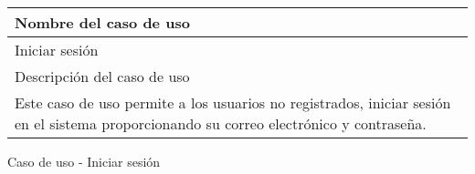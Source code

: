 \begin{identificacionCasoDeUso}
	\begin{tabular} { | p{17cm} |}

		\hline
		Nombre del caso de uso                                                                                                                  \\ \hline
		Iniciar sesión                                                                                                                          \\ \hline
		Descripción del caso de uso                                                                                                             \\ \hline
		Este caso de uso permite a los usuarios no registrados, iniciar sesión en el sistema proporcionando su correo electrónico y contraseña. \\ \hline
	\end{tabular}
	\caption{Caso de uso - Iniciar sesión}
\end{identificacionCasoDeUso}